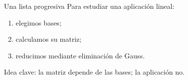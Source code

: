 \documentclass[aspectratio=169,11pt]{beamer}
\begin{document}
\begin{frame}{Una lista progresiva}
  Para estudiar una aplicación lineal:
  \begin{enumerate}
    \item elegimos bases;
    \pause
    \item calculamos su matriz;
    \pause
    \item reducimos mediante eliminación de Gauss.
  \end{enumerate}

  \medskip
  \alert{Idea clave:} la matriz depende de las bases; la aplicación no.
\end{frame}
\end{document}
